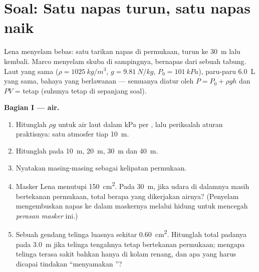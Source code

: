\section{Soal: Satu napas turun, satu napas naik}

\begin{problem}
\label{pb:g10:pressure:1}
Lena menyelam bebas: satu tarikan napas di permukaan, turun ke
\qty{30}{m} lalu kembali. Marco menyelam skuba di sampingnya, bernapas
dari sebuah tabung. Laut yang sama ($\rho = \qty{1025}{kg/m^3}$,
$g = \qty{9.81}{N/kg}$, $P_0 = \qty{101}{kPa}$), paru-paru
\qty{6.0}{L} yang sama, bahaya yang berlawanan --- semuanya diatur oleh
$P = P_0 + \rho g h$ dan $PV$ = tetap (suhunya tetap di sepanjang soal).

\medskip
\noindent\textbf{Bagian I ---  air.}
\begin{enumerate}
  \item Hitunglah $\rho g$ untuk air laut dalam \unit{kPa} per ,
        lalu periksalah aturan praktisnya: satu atmosfer tiap
        \qty{10}{m}.
  \item Hitunglah  pada \qty{10}{m}, \qty{20}{m},
        \qty{30}{m} dan \qty{40}{m}.
  \item Nyatakan masing-masing sebagai kelipatan  permukaan.
  \item Masker Lena menutupi \qty{150}{cm^2}. Pada \qty{30}{m}, jika
        udara di dalamnya masih bertekanan permukaan,  total berapa
        yang dikerjakan airnya? (Penyelam mengembuskan napas ke dalam
        maskernya melalui hidung untuk mencegah \emph{perasan masker}
        ini.)
  \item Sebuah gendang telinga luasnya sekitar \qty{0.60}{cm^2}.
        Hitunglah  total padanya pada \qty{3.0}{m} jika telinga
        tengahnya tetap bertekanan permukaan; mengapa telinga terasa
        sakit bahkan hanya di kolam renang, dan apa yang harus dicapai
        tindakan ``menyamakan ''?
\end{enumerate}


\end{problem}
